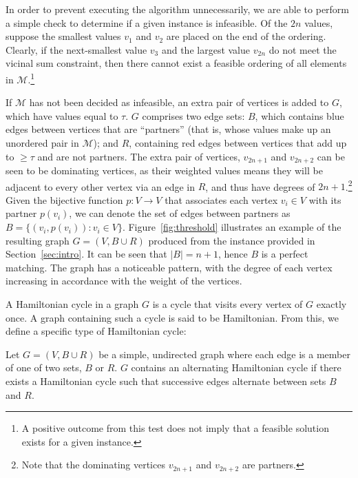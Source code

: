 \documentclass{elsarticle}
\begin{document}
In order to prevent executing the algorithm unnecessarily, we are able to perform a simple check to determine if a given instance is infeasible. Of the $2n$ values, suppose the smallest values $v_1$ and $v_2$ are placed on the end of the ordering. Clearly, if the next-smallest value $v_3$ and the largest value $v_{2n}$ do not meet the vicinal sum constraint, then there cannot exist a feasible ordering of all elements in $\mathcal{M}$.\footnote{A positive outcome from this test does not imply that a feasible solution exists for a given instance.}

If $\mathcal{M}$ has not been decided as infeasible, an extra pair of vertices is added to $G$, which have values equal to $\tau$. $G$ comprises two edge sets: $B$, which contains blue edges between vertices that are ``partners'' (that is, whose values make up an unordered pair in $\mathcal{M}$); and $R$, containing red edges between vertices that add up to $\geq \tau$ and are not partners. The extra pair of vertices, $v_{2n+1}$ and $v_{2n+2}$ can be seen to be dominating vertices, as their weighted values means they will be adjacent to every other vertex via an edge in $R$, and thus have degrees of $2n+1$.\footnote{Note that the dominating vertices $v_{2n+1}$ and $v_{2n+2}$ are partners.} Given the bijective function $p : V \to V$ that associates each vertex $v_i \in V$ with its partner $p(v_i)$, we can denote the set of edges between partners as $B = \{(v_i, p(v_i)) : v_i \in V\}$. Figure~\ref{fig:threshold} illustrates an example of the resulting graph $G = (V, B \cup R)$ produced from the instance provided in Section~\ref{sec:intro}. It can be seen that $|B| = n+1$, hence $B$ is a perfect matching. The graph has a noticeable pattern, with the degree of each vertex increasing in accordance with the weight of the vertices.

A Hamiltonian cycle in a graph $G$ is a cycle that visits every vertex of $G$ exactly once. A graph containing such a cycle is said to be Hamiltonian. From this, we define a specific type of Hamiltonian cycle:

\begin{definition}
	\label{defn:althamcycle}
	Let $G = (V, B \cup R)$ be a simple, undirected graph where each edge is a member of one of two sets, $B$ or $R$. $G$ contains an alternating Hamiltonian cycle if there exists a Hamiltonian cycle such that successive edges alternate between sets $B$ and $R$.
\end{definition}
\end{document}
